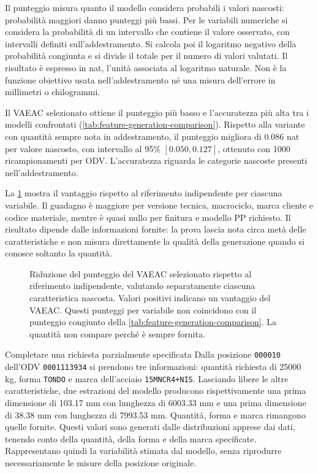 Il punteggio misura quanto il modello considera probabili i valori nascosti: probabilità maggiori danno punteggi più bassi. Per le variabili numeriche si considera la probabilità di un intervallo che contiene il valore osservato, con intervalli definiti sull'addestramento. Si calcola poi il logaritmo negativo della probabilità congiunta e si divide il totale per il numero di valori valutati. Il risultato è espresso in nat, l'unità associata al logaritmo naturale. Non è la funzione obiettivo usata nell'addestramento né una misura dell'errore in millimetri o chilogrammi.



Il VAEAC selezionato ottiene il punteggio più basso e l'accuratezza più alta tra i modelli confrontati (\cref{tab:feature-generation-comparison}). Rispetto alla variante con quantità sempre nota in addestramento, il punteggio migliora di \num{0.086} nat per valore nascosto, con intervallo al 95\% $[\num{0.050},\num{0.127}]$, ottenuto con \num{1000} ricampionamenti per ODV. L'accuratezza riguarda le categorie nascoste presenti nell'addestramento.

La \cref{fig:feature-generation-gains} mostra il vantaggio rispetto al riferimento indipendente per ciascuna variabile. Il guadagno è maggiore per versione tecnica, macrociclo, marca cliente e codice materiale, mentre è quasi nullo per finitura e modello PP richiesto. Il risultato dipende dalle informazioni fornite: la prova lascia nota circa metà delle caratteristiche e non misura direttamente la qualità della generazione quando si conosce soltanto la quantità.

\begin{figure}[H]
\centering
{}
\caption{Riduzione del punteggio del VAEAC selezionato rispetto al riferimento indipendente, valutando separatamente ciascuna caratteristica nascosta. Valori positivi indicano un vantaggio del VAEAC. Questi punteggi per variabile non coincidono con il punteggio congiunto della \cref{tab:feature-generation-comparison}. La quantità non compare perché è sempre fornita.}
\label{fig:feature-generation-gains}
\end{figure}

\begingroup
{}
\begin{examplebox}{Completare una richiesta parzialmente specificata}
Dalla posizione \texttt{000010} dell'ODV \texttt{0001113934} si prendono tre informazioni: quantità richiesta di \num{25000} kg, forma \texttt{TONDO} e marca dell'acciaio \texttt{15MNCR4+NIS}. Lasciando libere le altre caratteristiche, due estrazioni del modello producono rispettivamente una prima dimensione di \num{103.17} mm con lunghezza di \num{6003.33} mm e una prima dimensione di \num{38.38} mm con lunghezza di \num{7993.53} mm. Quantità, forma e marca rimangono quelle fornite. Questi valori sono generati dalle distribuzioni apprese dai dati, tenendo conto della quantità, della forma e della marca specificate. Rappresentano quindi la variabilità stimata dal modello, senza riprodurre necessariamente le misure della posizione originale.
\end{examplebox}
\endgroup

